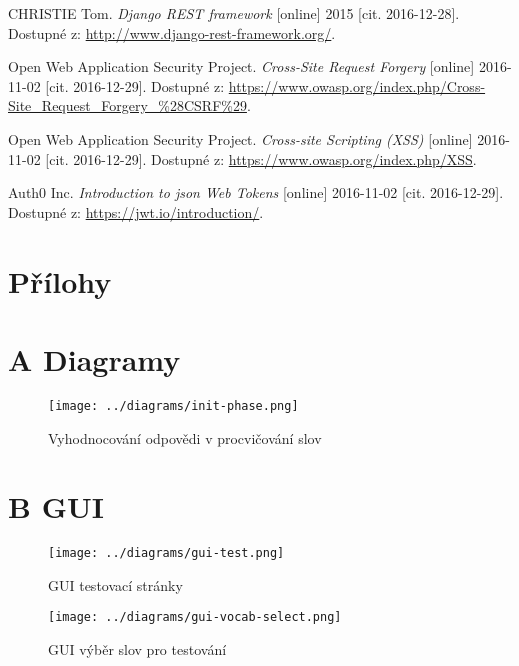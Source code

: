 \documentclass[a4paper,11pt,titlepage,fleqn]{article}
\begin{document}
\begin{thebibliography}{99}
        CHRISTIE Tom. \textit{Django REST framework} [online] 2015 [cit. 2016-12-28]. Dostupné z: \url{http://www.django-rest-framework.org/}.

       Open Web Application Security Project. \textit{Cross-Site Request Forgery} [online] 2016-11-02 [cit. 2016-12-29]. Dostupné z: \url{https://www.owasp.org/index.php/Cross-Site_Request_Forgery_%28CSRF%29}.

       Open Web Application Security Project. \textit{Cross-site Scripting (XSS)} [online] 2016-11-02 [cit. 2016-12-29]. Dostupné z: \url{https://www.owasp.org/index.php/XSS}.

       Auth0 Inc. \textit{Introduction to \gls{json} Web Tokens} [online] 2016-11-02 [cit. 2016-12-29]. Dostupné z: \url{https://jwt.io/introduction/}.
       
\end{thebibliography}

\newpage
\appendix

\thispagestyle{plain}
\section*{Přílohy}

\section*{A Diagramy}

\begin{figure}[ht!]
    \centering
    \texttt{[image: ../diagrams/init-phase.png]}
    \caption{Vyhodnocování odpovědi v procvičování slov}
\end{figure}


\newpage
\thispagestyle{plain}
\section*{B GUI}
\begin{figure}[ht!]
    \centering
    \texttt{[image: ../diagrams/gui-test.png]}
    \caption{GUI testovací stránky}
\end{figure}


\begin{figure}[ht!]
    \centering
    \texttt{[image: ../diagrams/gui-vocab-select.png]}
    \caption{GUI výběr slov pro testování}
\end{figure}
\end{document}

